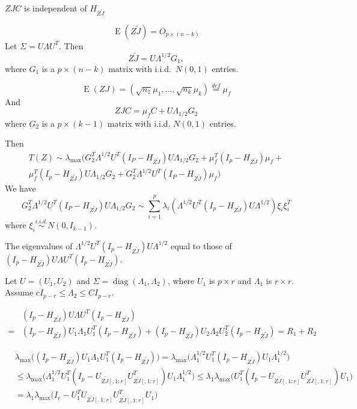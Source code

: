 \documentclass[review]{elsarticle}
\DeclareMathOperator{\mydiag}{diag}
\DeclareMathOperator{\myE}{E}
\theoremstyle{plain}
\theoremstyle{definition}
\theoremstyle{remark}
\begin{document}
$ZJC$ is independent of $H_{Z\tilde{J}}$

$$
\myE (Z\tilde{J}) = O_{p\times (n-k)}
$$
Let $\Sigma = U\Lambda U^T$. Then
$$
Z\tilde{J} = U\Lambda^{1/2} G_1,
$$
where $G_1$ is a $p\times (n-k)$ matrix with i.i.d.\ $N(0,1)$ entries.


$$
\myE (ZJ) =(\sqrt{n_1}\mu_1,\ldots,\sqrt{n_k}\mu_k)\overset{def}{=}\mu_{f}
$$
And
$$
ZJC = \mu_f C + U\Lambda_{1/2} G_2
$$
where $G_2$ is a $p\times (k-1)$ matrix with i.i.d. $N(0,1)$ entries.

Then 
$$
\begin{aligned}
T(Z)\sim \lambda_{\max}(
    G_2^T \Lambda^{1/2}U^T (I_P-H_{Z\tilde{J}})U\Lambda_{1/2}G_2+
\mu_f^T (I_p -H_{Z\tilde{J}})\mu_f+\\
    \mu_f^T (I_p -H_{Z\tilde{J}})U\Lambda_{1/2}G_2+
G_2^T \Lambda^{1/2}U^T (I_P-H_{Z\tilde{J}})\mu_f)
\end{aligned}
$$
We have
$$
    G_2^T \Lambda^{1/2}U^T (I_P-H_{Z\tilde{J}})U\Lambda_{1/2}G_2\sim
    \sum_{i=1}^p \lambda_i (\Lambda^{1/2}U^T (I_p-H_{Z\tilde{J}})U\Lambda^{1/2})\xi_i \xi_i^T
$$
where $\xi_i\overset{i.i.d.}{\sim} N(0,I_{k-1})$.

The eigenvalues of $\Lambda^{1/2}U^T (I_p-H_{Z\tilde{J}})U\Lambda^{1/2}$ equal to those of $(I_p-H_{Z\tilde{J}})U\Lambda U^T (I_p-H_{Z\tilde{J}})$.

Let $U=(U_1, U_2)$ and $\Sigma=\mydiag(\Lambda_1,\Lambda_2)$, where $U_1$ is $p\times r$ and $\Lambda_1$ is $r\times r$. Assume $c I_{p-r}\leq \Lambda_2\leq C I_{p-r}$.

$$
\begin{aligned}
    &(I_p-H_{Z\tilde{J}})U\Lambda U^T (I_p-H_{Z\tilde{J}})
    \\
    =&
    (I_p-H_{Z\tilde{J}})U_1\Lambda_1 U_1^T(I_p-H_{Z\tilde{J}})+(I_p-H_{Z\tilde{J}})U_2\Lambda_2 U_2^T (I_p-H_{Z\tilde{J}})
    =R_1+R_2
\end{aligned}
$$


$$
\begin{aligned}
    &\lambda_{\max}\big((I_p-H_{Z\tilde{J}})U_1\Lambda_1 U_1^T(I_p-H_{Z\tilde{J}})\big)
    =
    \lambda_{\max}\big(\Lambda_1^{1/2} U_1^T(I_p-H_{Z\tilde{J}}) U_1 \Lambda_1^{1/2}\big)\\
    &\leq 
    \lambda_{\max}\big(\Lambda_1^{1/2} U_1^T(I_p-U_{Z\tilde{J}[,1:r]}U_{Z\tilde{J}[,1:r]}^T) U_1 \Lambda_1^{1/2}\big)
    \leq 
    \lambda_1
    \lambda_{\max}\big(U_1^T(I_p-U_{Z\tilde{J}[,1:r]}U_{Z\tilde{J}[,1:r]}^T) U_1 \big)\\
    &= 
    \lambda_1
    \lambda_{\max}\big(I_r - U_1^TU_{Z\tilde{J}[,1:r]}U_{Z\tilde{J}[,1:r]}^T U_1 \big)\\
\end{aligned}
$$
\end{document}
